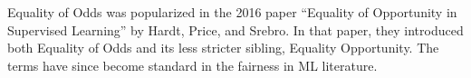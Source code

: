 \clearpage

\thispagestyle{customstyle}

{Equality of Odds was popularized in the 2016 paper “Equality of Opportunity in Supervised Learning” by Hardt, Price, and Srebro. 
In that paper, they introduced both Equality of Odds and its less stricter sibling, Equality Opportunity. The terms have since become standard
in the fairness in ML literature.}

